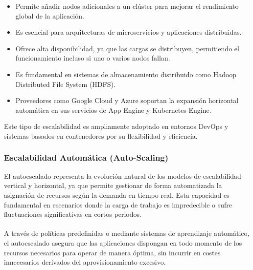 {                \begin{itemize}
                    \item Permite añadir nodos adicionales a un clúster para mejorar el rendimiento global de la aplicación.
                    \item Es esencial para arquitecturas de microservicios y aplicaciones distribuidas.
                    \item Ofrece alta disponibilidad, ya que las cargas se distribuyen, permitiendo el funcionamiento incluso si uno o varios nodos fallan.
                    \item Es fundamental en sistemas de almacenamiento distribuido como Hadoop Distributed File System (HDFS).
                    \item Proveedores como Google Cloud y Azure soportan la expansión horizontal automática en sus servicios de App Engine y Kubernetes Engine.
                \end{itemize}
                
                Este tipo de escalabilidad es ampliamente adoptado en entornos DevOps y sistemas basados en contenedores por su flexibilidad y eficiencia.
                
            \subsubsection{Escalabilidad Automática (Auto-Scaling)}
                El autoescalado representa la evolución natural de los modelos de escalabilidad vertical y horizontal, ya que permite gestionar de forma automatizada la asignación de recursos según la demanda en tiempo real. Esta capacidad es fundamental en escenarios donde la carga de trabajo es impredecible o sufre fluctuaciones significativas en cortos periodos.

                \paragraph{}A través de políticas predefinidas o mediante sistemas de aprendizaje automático, el autoescalado asegura que las aplicaciones dispongan en todo momento de los recursos necesarios para operar de manera óptima, sin incurrir en costes innecesarios derivados del aprovisionamiento excesivo.
                
}
